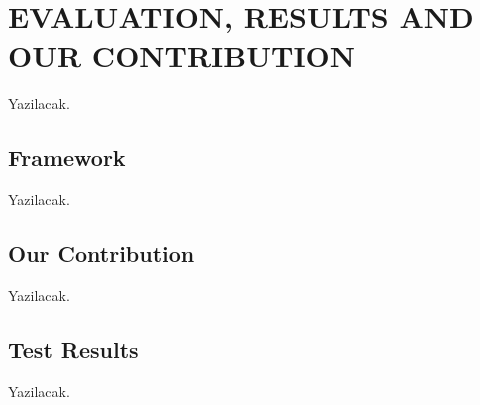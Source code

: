 \chapter{EVALUATION, RESULTS AND OUR CONTRIBUTION }\label{our_work}

Yazilacak.

\section{Framework}

Yazilacak.

\section{Our Contribution}

Yazilacak.

\section{Test Results}

Yazilacak.